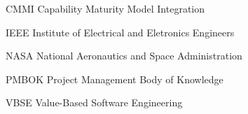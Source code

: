 \begin{siglas}
  \item CMMI Capability Maturity Model Integration
  \item IEEE Institute of Electrical and Eletronics Engineers
  \item NASA National Aeronautics and Space Administration
  \item PMBOK Project Management Body of Knowledge
  \item VBSE Value-Based Software Engineering
\end{siglas}
